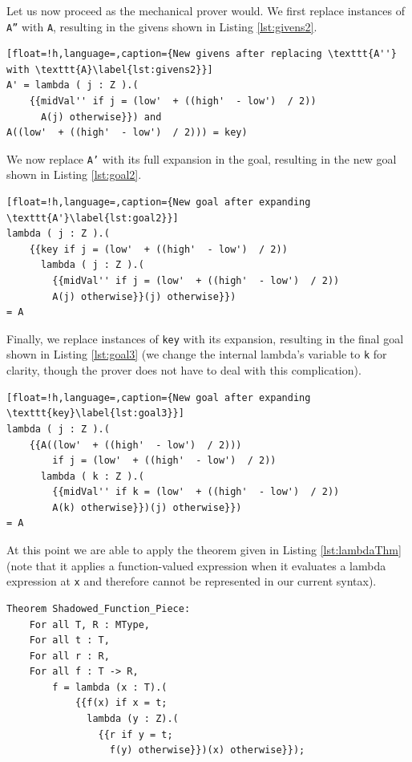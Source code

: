 

Let us now proceed as the mechanical prover would.  We first replace instances of \texttt{A''} with \texttt{A}, resulting in the givens shown in Listing \ref{lst:givens2}.

\begin{lstlisting}[float=!h,language=,caption={New givens after replacing \texttt{A''} with \texttt{A}\label{lst:givens2}}]
A' = lambda ( j : Z ).(
	{{midVal'' if j = (low'  + ((high'  - low')  / 2))
	  A(j) otherwise}}) and
A((low'  + ((high'  - low')  / 2))) = key)
\end{lstlisting}

We now replace \texttt{A'} with its full expansion in the goal, resulting in the new goal shown in Listing \ref{lst:goal2}.

\begin{lstlisting}[float=!h,language=,caption={New goal after expanding \texttt{A'}\label{lst:goal2}}]
lambda ( j : Z ).(
	{{key if j = (low'  + ((high'  - low')  / 2))
	  lambda ( j : Z ).(
		{{midVal'' if j = (low'  + ((high'  - low')  / 2))
	  	A(j) otherwise}}(j) otherwise}})
= A
\end{lstlisting}

Finally, we replace instances of \texttt{key} with its expansion, resulting in the final goal shown in Listing \ref{lst:goal3} (we change the internal lambda's variable to \texttt{k} for clarity, though the prover does not have to deal with this complication).

\begin{lstlisting}[float=!h,language=,caption={New goal after expanding \texttt{key}\label{lst:goal3}}]
lambda ( j : Z ).(
	{{A((low'  + ((high'  - low')  / 2))) 
		if j = (low'  + ((high'  - low')  / 2))
	  lambda ( k : Z ).(
		{{midVal'' if k = (low'  + ((high'  - low')  / 2))
	  	A(k) otherwise}})(j) otherwise}})
= A
\end{lstlisting}

At this point we are able to apply the theorem given in Listing \ref{lst:lambdaThm} (note that it applies a function-valued expression when it evaluates a lambda expression at \texttt{x} and therefore cannot be represented in our current syntax).

\begin{lstlisting}[float=!h,language=resolve,caption={A useful theorem about lambda expressions\label{lst:lambdaThm}}]
Theorem Shadowed_Function_Piece:
	For all T, R : MType,
	For all t : T,
	For all r : R,
	For all f : T -> R,
		f = lambda (x : T).(
			{{f(x) if x = t;
			  lambda (y : Z).(
				{{r if y = t;
				  f(y) otherwise}})(x) otherwise}});
\end{lstlisting}

